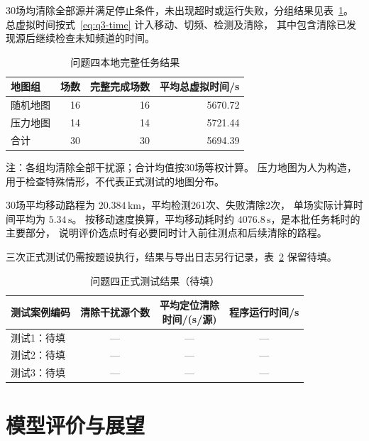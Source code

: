 \documentclass[UTF8,a4paper,12pt]{ctexart}
\begin{document}
30场均清除全部源并满足停止条件，未出现超时或运行失败，分组结果见表~\ref{tab:q4-completion}。
总虚拟时间按式~\eqref{eq:q3-time} 计入移动、切频、检测及清除，
其中包含清除已发现源后继续检查未知频道的时间。

\begin{table}[htbp]
  \centering
  \caption{问题四本地完整任务结果}
  \label{tab:q4-completion}
  \begin{tabular}{lrrr}
    \toprule
    地图组 & 场数 & 完整完成场数 & 平均总虚拟时间/s \\
    \midrule
    随机地图 & 16 & 16 & 5670.72 \\
    压力地图 & 14 & 14 & 5721.44 \\
    合计 & 30 & 30 & 5694.39 \\
    \bottomrule
  \end{tabular}
  \par\smallskip
  \parbox{0.94\linewidth}{\footnotesize 注：各组均清除全部干扰源；合计均值按30场等权计算。
  压力地图为人为构造，用于检查特殊情形，不代表正式测试的地图分布。}
\end{table}

30场平均移动路程为 $20.384\,\mathrm{km}$，平均检测261次、失败清除2次，
单场实际计算时间平均为 $5.34\,\mathrm s$。
按移动速度换算，平均移动耗时约 $4076.8\,\mathrm s$，是本批任务耗时的主要部分，
说明评价选点时有必要同时计入前往测点和后续清除的路程。

三次正式测试仍需按题设执行，结果与导出日志另行记录，表~\ref{tab:q4-official} 保留待填。
\begin{table}[htbp]
  \centering
  \caption{问题四正式测试结果（待填）}
  \label{tab:q4-official}
  \small
  \renewcommand{\arraystretch}{1.25}
  \begin{tabularx}{0.96\linewidth}{Xccc}
    \toprule
    测试案例编码 & 清除干扰源个数 & \shortstack{平均定位清除\\时间/(s/源)} & 程序运行时间/s \\
    \midrule
    测试1：待填 & --- & --- & --- \\
    测试2：待填 & --- & --- & --- \\
    测试3：待填 & --- & --- & --- \\
    \bottomrule
  \end{tabularx}
\end{table}
\FloatBarrier


\section{模型评价与展望}
\label{sec:discussion}
\end{document}
